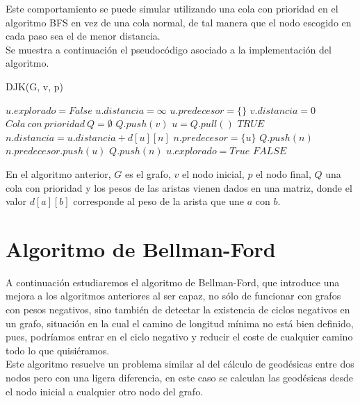 Este comportamiento se puede simular utilizando una cola con prioridad en el algoritmo BFS en vez de una cola normal, de tal manera que el nodo escogido en cada paso sea el de menor distancia. \\

Se muestra a continuación el pseudocódigo asociado a la implementación del algoritmo.

\begin{breakablealgorithm}
	\caption{DJK(G, v, p)}
	\begin{algorithmic}[1]
			\State $u.explorado = False$
			\State $u.distancia = \infty$
			\State $u.predecesor = \{\}$
		\EndFor
		\State $v.distancia = 0$
		\State $Cola\ con\ prioridad\ Q = \emptyset$
		\State $Q.push(v)$
			\State $u = Q.pull()$
					\Return $TRUE$
				\EndIf
							\State $n.distancia = u.distancia + d[u][n]$
							\State $n.predecesor = \{u\}$
							\State $Q.push(n)$
						\ElsIf{$n.distancia == u.distancia + d[u][n]$}
							\State $n.predecesor.push(u)$
							\State $Q.push(n)$
						\EndIf
					\EndIf
				\EndFor
				\State $u.explorado = True$
			\EndIf
		\EndWhile
		\Return $FALSE$
	\end{algorithmic}
\end{breakablealgorithm}

En el algoritmo anterior, $G$ es el grafo, $v$ el nodo inicial, $p$ el nodo final, $Q$ una cola con prioridad y los pesos de las aristas vienen dados en una matriz, donde el valor $d[a][b]$ corresponde al peso de la arista que une $a$ con $b$.

\section{Algoritmo de Bellman-Ford}\label{Bellman-Ford}

A continuación estudiaremos el algoritmo de Bellman-Ford, que introduce una mejora a los algoritmos anteriores al ser capaz, no sólo de funcionar con grafos con pesos negativos, sino también de detectar la existencia de ciclos negativos en un grafo, situación en la cual el camino de longitud mínima no está bien definido, pues, podríamos entrar en el ciclo negativo y reducir el coste de cualquier camino todo lo que quisiéramos. \\

Este algoritmo resuelve un problema similar al del cálculo de geodésicas entre dos nodos pero con una ligera diferencia, en este caso se calculan las geodésicas desde el nodo inicial a cualquier otro nodo del grafo. \\

